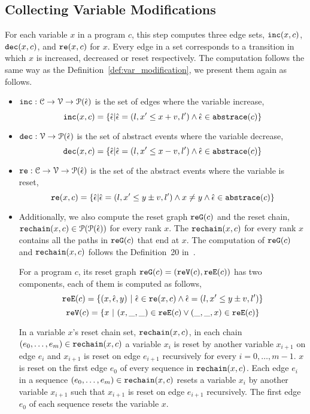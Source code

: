  \subsection{Collecting Variable Modifications}
 For each variable $x$ in a program $c$, this step computes three edge sets, $\mathtt{inc}(x, c)$, $\mathtt{dec}(x, c)$,
 and $\mathtt{re}(x, c)$ for $x$.
 Every edge in a set corresponds to a transition in which $x$ is increased,
 decreased
 or reset
 respectively.
 The computation follows the same way as the Definition~\ref{def:var_modification}, we present them again as follows.
 \begin{itemize}
 \item
 $\mathtt{inc}: \mathcal{C} \to \mathcal{V} \to \mathcal{P}(\hat{\mathtt{\epsilon}{}}) $
 is the set of edges where the variable increase, 
 \[ \inc(x, c) = \left\{ \absevent | \absevent = (l, x' \leq x + v, l') \land \absevent \in \absflow(c) \right\} \]
 \item
 $\mathtt{dec}: \mathcal{V} \to \mathcal{P}(\hat{\mathtt{\epsilon}{}}) $
 is the set of abstract events where the variable decrease,
 \[\dec(x, c) = \left\{\absevent| \absevent = (l, x' \leq x - v, l') \land \absevent \in \absflow(c) \right\}\]
 \item
 $\mathtt{re}: \mathcal{C} \to \mathcal{V} \to \mathcal{P}(\hat{\mathtt{\epsilon}{}}) $ is the set of the abstract events where the variable is reset,
%
 \[\reset(x, c) = \left\{ \absevent| \absevent = (l, x' \leq y \pm v, l') \land x \neq y \land \absevent \in \absflow(c) \right\}\]
 \item
 Additionally,
 we also compute the reset graph $\mathtt{re{G}}(c)$ and the reset chain, $\mathtt{rechain}(x, c) \in \mathcal{P}(\mathcal{P}(\hat{\mathtt{\epsilon}{}}))$ for every rank $x$.
 The $\mathtt{rechain}(x, c)$ for every rank $x$ contains all the paths in $\mathtt{re{G}}(c)$ that end at $x$.
 The computation of $\mathtt{re{G}}(c)$ and $\mathtt{rechain}(x, c)$ follows the Definition~20 in~\cite{SinnZV17}.
 \begin{defn}
    \label{def:resetgraph}
    For a program $c$, its reset graph $\mathtt{re{G}}(c) = (\mathtt{re{V}}(c), \mathtt{re{E}}(c))$ has two components,
    each of them is computed as follows,
 \[
    \resetE(c) = \left\{ (x, \absevent, y) ~\vert~ \absevent \in \reset(x, c) \land \absevent = (l, x' \leq y \pm v, l') \right\} 
 \]
 \[
    \resetV(c) = \left\{ x ~\vert~ (x, \_, \_) \in \resetE(c) \lor (\_, \_, x) \in \resetE(c) \right\} 
    \]
 \end{defn}
 In a variable $x$'s reset chain set, $\mathtt{rechain}(x, c)$, in each chain $(e_0, \ldots, e_m) \in \mathtt{rechain}(x, c)$
 a variable $x_i$ is reset by another variable $x_{i + 1}$ on edge $e_{i}$
 and $x_{i + 1}$ is reset on edge $e_{i + 1}$ recursively
 for every $i = 0, \ldots, m - 1$.
 $x$ is reset on the first edge $e_0$ of every sequence in $\mathtt{rechain}(x, c)$.
 {Each edge $e_i$ in a sequence $(e_0, \ldots, e_m) \in \mathtt{rechain}(x, c)$
 resets a variable $x_i$ by another variable $x_{i + 1}$ such that $x_{i + 1}$
 is reset on edge $e_{i + 1}$ recursively. The first edge $e_0$ of each sequence resets the variable $x$.}
 \end{itemize}
